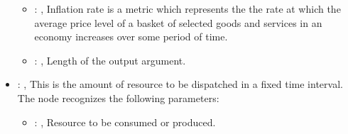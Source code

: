 \begin{itemize}
\begin{itemize}
        \item {}: , 
          Inflation rate is a metric which represents the     the rate at which the average price
          level of a basket of selected goods and services in an economy increases over some period
          of time.

        \item {}: , 
          Length of the output argument.
      \end{itemize}

    \item {}: , 
      This is the amount of resource to be dispatched in a fixed time interval.
      The  node recognizes the following parameters:
        \begin{itemize}
          \item {}: , 
            Resource to be consumed or produced.
      \end{itemize}
  \end{itemize}
